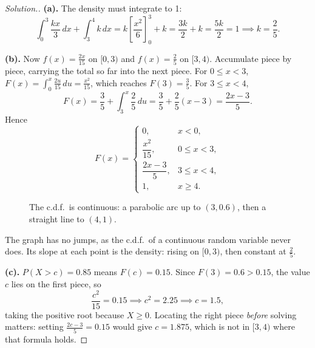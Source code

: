 \documentclass[12pt,a4paper]{report}
\theoremstyle{definition}
\theoremstyle{plain}
\theoremstyle{definition}
\newenvironment{solution}
  {\renewcommand{\qedsymbol}{}\begin{proof}[\textit{Solution}.]}
  {\end{proof}}
\begin{document}
\begin{solution}
\textbf{(a).} The density must integrate to 1:
\[\int_0^3\frac{kx}{3}\,dx+\int_3^4 k\,dx = k\left[\frac{x^{2}}{6}\right]_0^3+k
 = \frac{3k}{2}+k = \frac{5k}{2} = 1 \implies k = \frac{2}{5}.\]

\textbf{(b).} Now $f(x) = \frac{2x}{15}$ on $[0,3)$ and $f(x) = \frac{2}{5}$ on $[3,4)$.
Accumulate piece by piece, carrying the total so far into the next piece. For
$0\leq x<3$, $F(x) = \int_0^x\frac{2u}{15}\,du = \frac{x^{2}}{15}$, which reaches
$F(3) = \frac{3}{5}$. For $3\leq x<4$,
\[F(x) = \frac{3}{5}+\int_3^x\frac{2}{5}\,du = \frac{3}{5}+\frac{2}{5}(x-3) = \frac{2x-3}{5}.\]
Hence
\[F(x) = \begin{cases}
0, & x<0,\\[2pt]
\dfrac{x^{2}}{15}, & 0\leq x<3,\\[6pt]
\dfrac{2x-3}{5}, & 3\leq x<4,\\[4pt]
1, & x\geq 4.
\end{cases}\]
\begin{figure}[H]
\centering
{}
\caption{The c.d.f.\ is continuous: a parabolic arc up to $(3,0.6)$, then a straight
line to $(4,1)$.}
\end{figure}
The graph has no jumps, as the c.d.f.\ of a continuous random variable never does. Its
slope at each point is the density: rising on $[0,3)$, then constant at $\frac{2}{5}$.

\textbf{(c).} $P(X>c) = 0.85$ means $F(c) = 0.15$. Since $F(3) = 0.6>0.15$, the value
$c$ lies on the first piece, so
\[\frac{c^{2}}{15} = 0.15 \implies c^{2} = 2.25 \implies c = 1.5,\]
taking the positive root because $X\geq 0$. Locating the right piece \emph{before}
solving matters: setting $\frac{2c-3}{5} = 0.15$ would give $c = 1.875$, which is not in
$[3,4)$ where that formula holds.
\end{solution}
\end{document}
